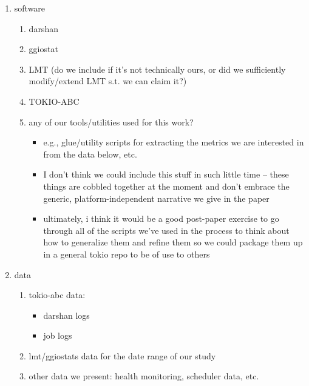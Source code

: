 \appendix






\begin{enumerate}
\item software
    \begin{enumerate}
    \item darshan
    \item ggiostat
    \item LMT (do we include if it's not technically ours, or did we sufficiently modify/extend LMT s.t. we can claim it?)
    \item TOKIO-ABC
    \item any of our tools/utilities used for this work?
        \begin{itemize}
        \item e.g., glue/utility scripts for extracting the metrics we are interested in from the data below, etc.
        \item I don't think we could include this stuff in such little time -- these things are cobbled together at the moment and don't embrace the generic, platform-independent narrative we give in the paper
        \item ultimately, i think it would be a good post-paper exercise to go through all of the scripts we've used in the process to think about how to generalize them and refine them so we could package them up in a general tokio repo to be of use to others
        \end{itemize}
    \end{enumerate}

\item data
    \begin{enumerate}
    \item tokio-abc data:
        \begin{itemize}
        \item darshan logs
        \item job logs
        \end{itemize}
    \item lmt/ggiostats data for the date range of our study
    \item other data we present: health monitoring, scheduler data, etc.
    \end{enumerate}
\end{enumerate}
